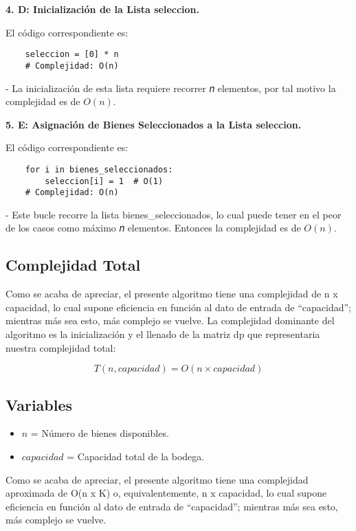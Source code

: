 \textbf{4. D: Inicialización de la Lista seleccion.}

El código correspondiente es:
\begin{lstlisting}
	seleccion = [0] * n
	# Complejidad: O(n)
\end{lstlisting}
- La inicialización de esta lista requiere recorrer 𝑛 elementos, por tal motivo la complejidad es de \( O(n) \).

\textbf{5. E: Asignación de Bienes Seleccionados a la Lista seleccion.}

El código correspondiente es:
\begin{lstlisting}
	for i in bienes_seleccionados:
		seleccion[i] = 1  # O(1)
	# Complejidad: O(n)
\end{lstlisting}
- Este bucle recorre la lista bienes_seleccionados, lo cual puede tener en el peor de los casos como máximo 𝑛 elementos. Entonces la complejidad es de \( O(n) \).


\subsection*{Complejidad Total}

Como se acaba de apreciar, el presente algoritmo tiene una complejidad de n x capacidad, lo cual supone eficiencia en función al dato de entrada de “capacidad”; mientras más sea esto, más complejo se vuelve.
La complejidad dominante del algoritmo es la inicialización y el llenado de la matriz dp que representaria nuestra complejidad total:

\[
T(n, capacidad) = O(n \times capacidad)
\]

\subsection*{Variables}

\begin{itemize}
	\item \( n \) = Número de bienes disponibles.
	\item \( capacidad \) = Capacidad total de la bodega.
\end{itemize}




Como se acaba de apreciar, el presente algoritmo tiene una complejidad aproximada de O(n x K) o, equivalentemente, n x capacidad, lo cual supone eficiencia en función al dato de entrada de “capacidad”; mientras más sea esto, más complejo se vuelve.

